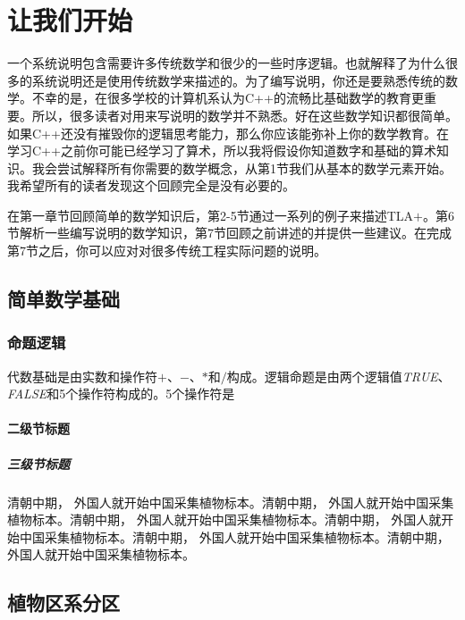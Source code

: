\documentclass[utf8]{book}
\begin{document}
\part{让我们开始}
一个系统说明包含需要许多传统数学和很少的一些时序逻辑。也就解释了为什么很多的系统说明还是使用传统数学来描述的。为了编写说明，你还是要熟悉传统的数学。不幸的是，在很多学校的计算机系认为C++的流畅比基础数学的教育更重要。所以，很多读者对用来写说明的数学并不熟悉。好在这些数学知识都很简单。如果C++还没有摧毁你的逻辑思考能力，那么你应该能弥补上你的数学教育。在学习C++之前你可能已经学习了算术，所以我将假设你知道数字和基础的算术知识。我会尝试解释所有你需要的数学概念，从第1节我们从基本的数学元素开始。我希望所有的读者发现这个回顾完全是没有必要的。

在第一章节回顾简单的数学知识后，第2-5节通过一系列的例子来描述TLA$+$。第6节解析一些编写说明的数学知识，第7节回顾之前讲述的并提供一些建议。在完成第7节之后，你可以应对对很多传统工程实际问题的说明。

\chapter{简单数学基础}

\section{命题逻辑}
代数基础是由实数和操作符$+$、$-$、$*$和$/$构成。逻辑命题是由两个逻辑值\textit{TRUE}、\textit{FALSE}和5个操作符构成的。5个操作符是


\subsection{二级节标题}

\subsubsection{三级节标题}

\begin{multicols}{2}

清朝中期， 外国人就开始中国采集植物标本。清朝中期， 外国人就开始中国采集植物标本。清朝中期， 外国人就开始中国采集植物标本。清朝中期， 外国人就开始中国采集植物标本。清朝中期， 外国人就开始中国采集植物标本。清朝中期， 外国人就开始中国采集植物标本。

\end{multicols}

\chapter{植物区系分区}
\end{document}
